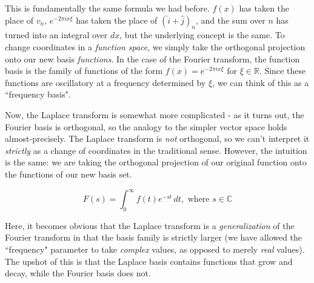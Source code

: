 This is fundamentally the same formula we had before. $f(x)$ has taken the place
of $v_n$, $e^{-2\pi ix \xi}$ has taken the place of $(\hat{i} + \hat{j})_n$, and
the sum over $n$ has turned into an integral over $dx$, but the underlying
concept is the same. To change coordinates in a \textit{function space}, we
simply take the orthogonal projection onto our new basis \textit{functions}. In
the case of the Fourier transform, the function basis is the family of functions
of the form $f(x) = e^{-2\pi ix \xi} \text{ for } \xi \in \mathbb{R}$. Since
these functions are oscillatory at a frequency determined by $\xi$, we can think
of this as a ``frequency basis".

Now, the Laplace transform is somewhat more complicated - as it turns out, the
Fourier basis is orthogonal, so the analogy to the simpler vector space holds
almost-precisely. The Laplace transform is \textit{not} orthogonal, so we can't
interpret it \textit{strictly} as a change of coordinates in the traditional
sense. However, the intuition is the same: we are taking the orthogonal
projection of our original function onto the functions of our new basis set.

\begin{equation*}
  F(s) = \int_0^\infty f(t) e^{-st} \,dt, \text{ where } s \in \mathbb{C}
\end{equation*}

Here, it becomes obvious that the Laplace transform is a \textit{generalization}
of the Fourier transform in that the basis family is strictly larger (we have
allowed the ``frequency" parameter to take \textit{complex} values, as opposed
to merely \textit{real} values). The upshot of this is that the Laplace basis
contains functions that grow and decay, while the Fourier basis does not.
